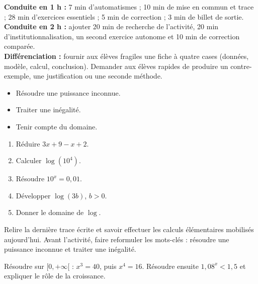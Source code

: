 \ifprof
\begin{methode}
\textbf{Conduite en 1 h :} 7 min d'automatismes ; 10 min de mise en commun et trace ; 28 min d'exercices essentiels ; 5 min de correction ; 3 min de billet de sortie.\\
\textbf{Conduite en 2 h :} ajouter 20 min de recherche de l'activité, 20 min d'institutionnalisation, un second exercice autonome et 10 min de correction comparée.\\
\textbf{Différenciation :} fournir aux élèves fragiles une fiche à quatre cases (données, modèle, calcul, conclusion). Demander aux élèves rapides de produire un contre-exemple, une justification ou une seconde méthode.
\end{methode}
\fi
{}
\begin{objectifs}\begin{itemize}\item Résoudre une puissance inconnue.\item Traiter une inégalité.\item Tenir compte du domaine.\end{itemize}\end{objectifs}
\begin{automatismes}\begin{enumerate}\item Réduire $3x+9-x+2$. \item Calculer $\log(10^4)$. \item Résoudre $10^x=0{,}01$. \item Développer $\log(3b)$, $b>0$. \item Donner le domaine de $\log$. \rep{$]0,+\infty[$}\end{enumerate}\end{automatismes}
\begin{prerequis}Relire la dernière trace écrite et savoir effectuer les calculs élémentaires mobilisés aujourd'hui. Avant l'activité, faire reformuler les mots-clés : résoudre une puissance inconnue et traiter une inégalité.\end{prerequis}

\begin{activite}
Résoudre sur $[0,+\infty[$ : $x^3=40$, puis $x^4=16$. Résoudre ensuite $1{,}08^x<1{,}5$ et expliquer le rôle de la croissance.

\end{activite}

